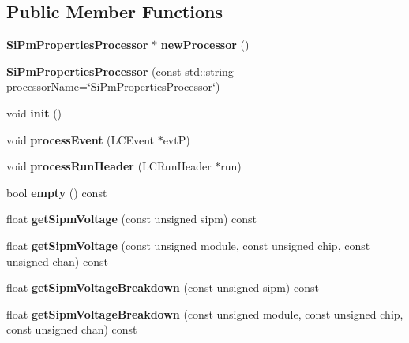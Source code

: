 \subsection*{Public Member Functions}
\begin{DoxyCompactItemize}
\item 
{\bf SiPmPropertiesProcessor} $\ast$ {\bfseries newProcessor} ()\label{classCALICE_1_1SiPmPropertiesProcessor_afd454eeb6fff1290816bf47ea42f898c}

\item 
{\bfseries SiPmPropertiesProcessor} (const std::string processorName=\char`\"{}SiPmPropertiesProcessor\char`\"{})\label{classCALICE_1_1SiPmPropertiesProcessor_a044da56a6b19162530ec61e971cfb3aa}

\item 
void {\bfseries init} ()\label{classCALICE_1_1SiPmPropertiesProcessor_a18867a127570598ad26694719ab3c771}

\item 
void {\bfseries processEvent} (LCEvent $\ast$evtP)\label{classCALICE_1_1SiPmPropertiesProcessor_aee931cd7fc7aae6d8cac48383ccf7ddb}

\item 
void {\bfseries processRunHeader} (LCRunHeader $\ast$run)\label{classCALICE_1_1SiPmPropertiesProcessor_aecd18f72518fdf995c5b4f4999f9cc0f}

\item 
bool {\bfseries empty} () const \label{classCALICE_1_1SiPmPropertiesProcessor_a96c5115d41b6e12ac39c9cd0a26f09f7}

\item 
float {\bfseries getSipmVoltage} (const unsigned sipm) const \label{classCALICE_1_1SiPmPropertiesProcessor_a2307382303dd5bb2c08d3295990a4f60}

\item 
float {\bfseries getSipmVoltage} (const unsigned module, const unsigned chip, const unsigned chan) const \label{classCALICE_1_1SiPmPropertiesProcessor_a1de2cff608caca6853e6dd49548cc850}

\item 
float {\bfseries getSipmVoltageBreakdown} (const unsigned sipm) const \label{classCALICE_1_1SiPmPropertiesProcessor_a8a39af189b46542e8d1856c57c5d188c}

\item 
float {\bfseries getSipmVoltageBreakdown} (const unsigned module, const unsigned chip, const unsigned chan) const \label{classCALICE_1_1SiPmPropertiesProcessor_a14383cb4e8ea51d094b7fa26da0ff285}


\end{DoxyCompactItemize}
